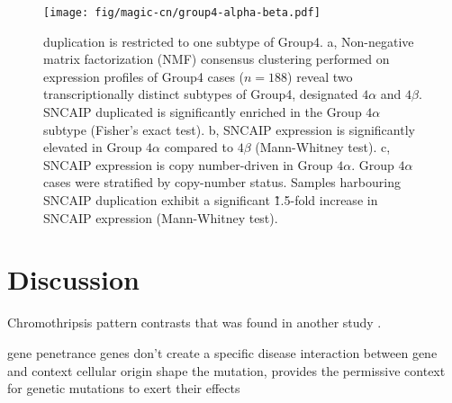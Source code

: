 \begin{figure}[b]
	\begin{center}
		\texttt{[image: fig/magic-cn/group4-alpha-beta.pdf]}
	\end{center}
	\caption[ duplication is restricted to one subtype of Group4]
	{
	 duplication is restricted to one subtype of Group4.
	\textsf{a}, Non-negative matrix factorization (NMF) consensus clustering performed on expression profiles of Group4 cases ($n = 188$) reveal two transcriptionally distinct subtypes of Group4, designated $4\alpha$ and $4\beta$. SNCAIP duplicated is significantly enriched in the Group $4\alpha$ subtype (Fisher's exact test).
	\textsf{b}, SNCAIP expression is significantly elevated in Group $4\alpha$ compared to $4\beta$ (Mann-Whitney test).
	\textsf{c}, SNCAIP expression is copy number-driven in Group $4\alpha$. Group $4\alpha$ cases were stratified by  copy-number status. Samples harbouring SNCAIP duplication exhibit a significant \~1.5-fold increase in SNCAIP expression (Mann-Whitney test).
	}
	\label{fig:group4-alpha-beta}
\end{figure}

\clearpage

\section{Discussion}

Chromothripsis pattern contrasts that was found in another study .

gene penetrance
genes don't create a specific disease
interaction between gene and context
cellular origin shape the mutation, provides the permissive context for genetic mutations to exert their effects

